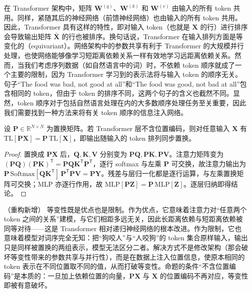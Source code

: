 \documentclass[../../main.tex]{subfiles}
\begin{document}
在 Transformer 架构中，矩阵 $\mathbf{W}^{(q)}$、$\mathbf{W}^{(k)}$ 和 $\mathbf{W}^{(v)}$ 由输入的所有 token 共用。同样，紧随其后的神经网络（前馈神经网络）也由输入的所有 token 共用。因此，Transformer 具有这样的特性，即对输入 token（也就是 $\mathbf{X}$ 的行）进行排序会导致输出矩阵 $\bar{\mathbf{X}}$ 的行也被排序。换句话说，Transformer 在输入排列方面是等变化的（equivariant）。网络架构中的参数共享有利于 Transformer 的大规模并行处理，也使网络能够像学习短距离依赖关系一样有效地学习远距离依赖关系。然而，当我们考虑序列数据（如自然语言中的词）时，不依赖 token 顺序就成了一个主要的限制，因为 Transformer 学习到的表示法将与输入 token 的顺序无关。句子“The food was bad, not good at all”和“The food was good, not bad at all”包含相同的 token，但由于 token 的排序不同，这两个句子的含义也截然不同。显然，token 顺序对于包括自然语言处理在内的大多数顺序处理任务至关重要，因此我们需要找到一种方法来将有关 token 顺序的信息注入网络。

\begin{proposition}\label{proposition:ch12-排列等变}
设 $\mathbf{P}\in\mathbb{R}^{N\times N}$ 为置换矩阵。若 Transformer 层不含位置编码，则对任意输入 $\mathbf{X}$ 有 $\mathrm{TL}[\mathbf{P}\mathbf{X}]=\mathbf{P}\,\mathrm{TL}[\mathbf{X}]$，即输出随输入的 token 排列同步置换。
\end{proposition}

\begin{proof}
置换成 $\mathbf{PX}$ 后，$\mathbf{Q},\mathbf{K},\mathbf{V}$ 分别变为 $\mathbf{PQ},\mathbf{PK},\mathbf{PV}$。注意力矩阵变为 $(\mathbf{PQ})(\mathbf{PK})^{\mathsf{T}}=\mathbf{P}\mathbf{Q}\mathbf{K}^{\mathsf{T}}\mathbf{P}^{\mathsf{T}}$，逐行 softmax 与左乘 $\mathbf{P}$ 可交换，故注意力输出为 $\mathbf{P}\,\mathrm{Softmax}[\mathbf{Q}\mathbf{K}^{\mathsf{T}}]\,\mathbf{P}^{\mathsf{T}}\mathbf{PV}=\mathbf{P}\mathbf{Y}$。残差与层归一化都是逐行运算，与左乘置换矩阵可交换；MLP 亦逐行作用，故 $\mathrm{MLP}[\mathbf{P}\mathbf{Z}]=\mathbf{P}\,\mathrm{MLP}[\mathbf{Z}]$。逐层归纳即得结论。
\end{proof}

\begin{remark}（重构新增）
等变性既是优点也是限制。作为优点，它意味着注意力对“任意两个 token 之间的关系”建模，与它们相距多远无关，因此长距离依赖与短距离依赖被同等对待——这是 Transformer 相对递归神经网络的根本改进。作为限制，它也意味着模型对词序完全无知：把“狗咬人”与“人咬狗”的 token 集合原样输入，输出只是同样被置换的两组表示，模型无法区分二者。解决方式不是修改架构（那会破坏等变性带来的参数共享与并行性），而是在数据上注入位置信息，使原本相同的 token 表示在不同位置取不同的值，从而打破等变性。命题的条件“不含位置编码”是本质的：一旦加上依赖位置的向量，$\mathbf{P}\mathbf{X}$ 与 $\mathbf{X}$ 的位置编码不再对应，等变性即被有意破坏。
\end{remark}
\end{document}
